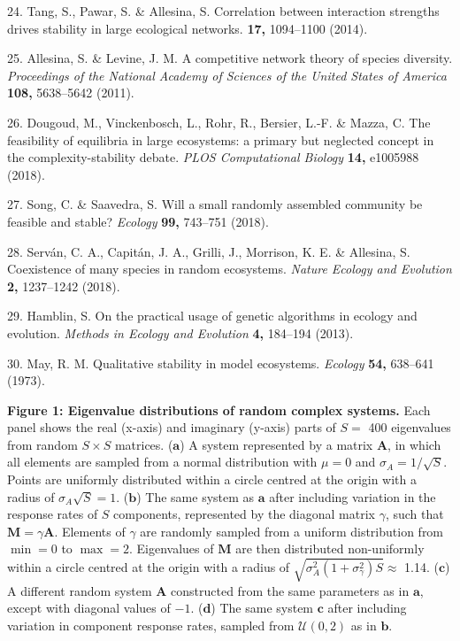 \documentclass[]{article}
\begin{document}
\hypertarget{ref-Tang2014c}{}
24. Tang, S., Pawar, S. \& Allesina, S. Correlation between interaction
strengths drives stability in large ecological networks. \textbf{17,}
1094--1100 (2014).

\hypertarget{ref-Allesina2011}{}
25. Allesina, S. \& Levine, J. M. A competitive network theory of
species diversity. \emph{Proceedings of the National Academy of Sciences
of the United States of America} \textbf{108,} 5638--5642 (2011).

\hypertarget{ref-Dougoud2018}{}
26. Dougoud, M., Vinckenbosch, L., Rohr, R., Bersier, L.-F. \& Mazza, C.
The feasibility of equilibria in large ecosystems: a primary but
neglected concept in the complexity-stability debate. \emph{PLOS
Computational Biology} \textbf{14,} e1005988 (2018).

\hypertarget{ref-Song2018}{}
27. Song, C. \& Saavedra, S. Will a small randomly assembled community
be feasible and stable? \emph{Ecology} \textbf{99,} 743--751 (2018).

\hypertarget{ref-Servan2018}{}
28. Serván, C. A., Capitán, J. A., Grilli, J., Morrison, K. E. \&
Allesina, S. Coexistence of many species in random ecosystems.
\emph{Nature Ecology and Evolution} \textbf{2,} 1237--1242 (2018).

\hypertarget{ref-Hamblin2013}{}
29. Hamblin, S. On the practical usage of genetic algorithms in ecology
and evolution. \emph{Methods in Ecology and Evolution} \textbf{4,}
184--194 (2013).

\hypertarget{ref-May1973}{}
30. May, R. M. Qualitative stability in model ecosystems. \emph{Ecology}
\textbf{54,} 638--641 (1973).

\clearpage

\textbf{Figure 1: Eigenvalue distributions of random complex systems.}
Each panel shows the real (x-axis) and imaginary (y-axis) parts of
\(S =\) 400 eigenvalues from random \(S \times S\) matrices.
(\(\textbf{a}\)) A system represented by a matrix \(\mathbf{A}\), in
which all elements are sampled from a normal distribution with
\(\mu = 0\) and \(\sigma_{A} = 1/\sqrt{S}\). Points are uniformly
distributed within a circle centred at the origin with a radius of
\(\sigma_{A} \sqrt{S} = 1\). (\(\textbf{b}\)) The same system as
\(\textbf{a}\) after including variation in the response rates of \(S\)
components, represented by the diagonal matrix \(\gamma\), such that
\(\mathbf{M} = \gamma\mathbf{A}\). Elements of \(\gamma\) are randomly
sampled from a uniform distribution from \(\min = 0\) to \(\max = 2\).
Eigenvalues of \(\mathbf{M}\) are then distributed non-uniformly within
a circle centred at the origin with a radius of
\(\sqrt{\sigma^{2}_{A}(1 + \sigma^{2}_{\gamma})S} \approx\) 1.14.
(\(\textbf{c}\)) A different random system \(\mathbf{A}\) constructed
from the same parameters as in \(\textbf{a}\), except with diagonal
values of \(-1\). (\(\textbf{d}\)) The same system \(\textbf{c}\) after
including variation in component response rates, sampled from
\(\mathcal{U}(0, 2)\) as in \(\textbf{b}\).
\end{document}
